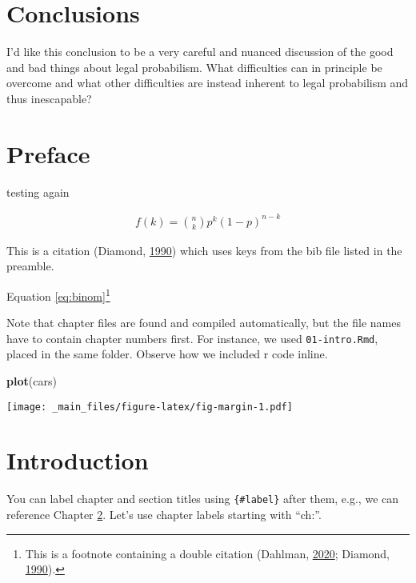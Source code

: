 \documentclass[]{book}
\newenvironment{Shaded}{\begin{snugshade}}{\end{snugshade}}
\newcommand{\KeywordTok}[1]{\textcolor[rgb]{0.13,0.29,0.53}{\textbf{#1}}}
\newcommand{\NormalTok}[1]{#1}
\begin{document}
\chapter{Conclusions}

I'd like this conclusion
to be a very
careful and nuanced discussion of the
good and bad things about
legal probabilism. What difficulties can
in principle be overcome and what other difficulties are instead
inherent to legal probabilism and thus inescapable?

\hypertarget{preface}{%
\chapter*{Preface}\label{preface}}

testing again

\begin{align} 
  f\left(k\right) = \binom{n}{k} p^k\left(1-p\right)^{n-k}
  \label{eq:binom}
\end{align}

This is a citation (Diamond, \protect\hyperlink{ref-diamond90}{1990}) which uses keys from the bib file listed in the preamble.

Equation \eqref{eq:binom}\footnote{This is a footnote containing a double citation (Dahlman, \protect\hyperlink{ref-dahlmanNakedStat2020}{2020}; Diamond, \protect\hyperlink{ref-diamond90}{1990}).}

Note that chapter files are found and compiled automatically, but the file names have to contain chapter numbers first. For instance, we used \texttt{01-intro.Rmd}, placed in the same folder. Observe how we included r code inline.

\begin{Shaded}
\begin{Highlighting}[]
\KeywordTok{plot}\NormalTok{(cars)}
\end{Highlighting}
\end{Shaded}

\texttt{[image: \_main\_files/figure-latex/fig-margin-1.pdf]}

\hypertarget{ch:intro}{%
\chapter{Introduction}\label{ch:intro}}

You can label chapter and section titles using \texttt{\{\#label\}} after them, e.g., we can reference Chapter \ref{ch:intro}.
Let's use chapter labels starting with ``ch:''.
\end{document}
